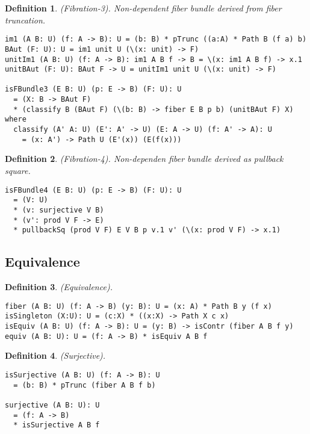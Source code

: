 \documentclass{article}
\newtheorem{definition}{Definition}
\begin{document}
\begin{definition} (Fibration-3). Non-dependent fiber bundle derived from fiber truncation.
\begin{lstlisting}
im1 (A B: U) (f: A -> B): U = (b: B) * pTrunc ((a:A) * Path B (f a) b)
BAut (F: U): U = im1 unit U (\(x: unit) -> F)
unitIm1 (A B: U) (f: A -> B): im1 A B f -> B = \(x: im1 A B f) -> x.1
unitBAut (F: U): BAut F -> U = unitIm1 unit U (\(x: unit) -> F)

isFBundle3 (E B: U) (p: E -> B) (F: U): U
  = (X: B -> BAut F)
  * (classify B (BAut F) (\(b: B) -> fiber E B p b) (unitBAut F) X) where
  classify (A' A: U) (E': A' -> U) (E: A -> U) (f: A' -> A): U
    = (x: A') -> Path U (E'(x)) (E(f(x)))
\end{lstlisting}
\end{definition}

\begin{definition} (Fibration-4). Non-dependen fiber bundle derived as pullback square.
\begin{lstlisting}
isFBundle4 (E B: U) (p: E -> B) (F: U): U
  = (V: U)
  * (v: surjective V B)
  * (v': prod V F -> E)
  * pullbackSq (prod V F) E V B p v.1 v' (\(x: prod V F) -> x.1)
\end{lstlisting}
\end{definition}

\newpage
\subsection{Equivalence}

\begin{definition} (Equivalence).
\begin{lstlisting}
fiber (A B: U) (f: A -> B) (y: B): U = (x: A) * Path B y (f x)
isSingleton (X:U): U = (c:X) * ((x:X) -> Path X c x)
isEquiv (A B: U) (f: A -> B): U = (y: B) -> isContr (fiber A B f y)
equiv (A B: U): U = (f: A -> B) * isEquiv A B f
\end{lstlisting}
\end{definition}

\begin{definition} (Surjective).
\begin{lstlisting}
isSurjective (A B: U) (f: A -> B): U
  = (b: B) * pTrunc (fiber A B f b)

surjective (A B: U): U
  = (f: A -> B)
  * isSurjective A B f
\end{lstlisting}
\end{definition}
\end{document}
